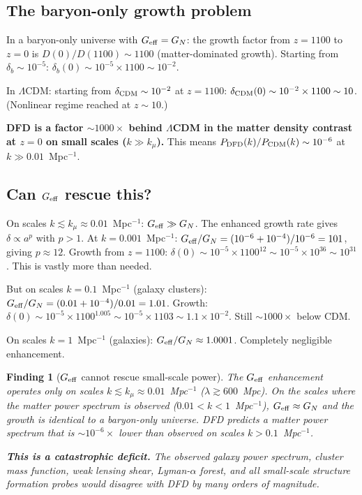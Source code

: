 \documentclass[11pt]{article}
\newtheorem{finding}{Finding}
\newcommand{\ee}[1]{\times 10^{#1}}
\newcommand{\LCDM}{$\Lambda$CDM}
\newcommand{\Geff}{G_{\rm eff}}
\newcommand{\kmu}{k_\mu}
\begin{document}
\subsection{The baryon-only growth problem}

In a baryon-only universe with $\Geff = G_N$: the growth factor from
$z = 1100$ to $z = 0$ is $D(0)/D(1100) \sim 1100$ (matter-dominated
growth). Starting from $\delta_b \sim 10^{-5}$:
$\delta_b(0) \sim 10^{-5} \times 1100 \sim 10^{-2}$.

In \LCDM: starting from $\delta_{\rm CDM} \sim 10^{-2}$ at $z = 1100$:
$\delta_{\rm CDM}(0) \sim 10^{-2} \times 1100 \sim 10$.
(Nonlinear regime reached at $z \sim 10$.)

\textbf{DFD is a factor $\sim 1000\times$ behind \LCDM{} in the matter
density contrast at $z = 0$ on small scales ($k \gg \kmu$).}
This means $P_{\rm DFD}(k) / P_{\rm CDM}(k) \sim 10^{-6}$ at
$k \gg 0.01$~Mpc$^{-1}$.

\subsection{Can $\Geff$ rescue this?}

On scales $k \lesssim \kmu \approx 0.01$~Mpc$^{-1}$: $\Geff \gg G_N$.
The enhanced growth rate gives $\delta \propto a^p$ with $p > 1$.
At $k = 0.001$~Mpc$^{-1}$: $\Geff/G_N = (10^{-6} + 10^{-4})/10^{-6}
= 101$, giving $p \approx 12$. Growth from $z = 1100$:
$\delta(0) \sim 10^{-5} \times 1100^{12} \sim 10^{-5} \times 10^{36}
\sim 10^{31}$. This is vastly more than needed.

But on scales $k = 0.1$~Mpc$^{-1}$ (galaxy clusters):
$\Geff/G_N = (0.01 + 10^{-4})/0.01 = 1.01$. Growth:
$\delta(0) \sim 10^{-5} \times 1100^{1.005} \sim 10^{-5} \times 1103
\sim 1.1\ee{-2}$. Still $\sim 1000\times$ below CDM.

On scales $k = 1$~Mpc$^{-1}$ (galaxies): $\Geff/G_N \approx 1.0001$.
Completely negligible enhancement.

\begin{finding}[$\Geff$ cannot rescue small-scale power]
\label{find:geff-rescue}
The $\Geff$ enhancement operates only on scales $k \lesssim \kmu
\approx 0.01$~Mpc$^{-1}$ ($\lambda \gtrsim 600$~Mpc). On the
scales where the matter power spectrum is observed ($0.01 < k < 1$~Mpc$^{-1}$),
$\Geff \approx G_N$ and the growth is identical to a baryon-only
universe. DFD predicts a matter power spectrum that is
$\sim 10^{-6}\times$ lower than observed on scales $k > 0.1$~Mpc$^{-1}$.

\textbf{This is a catastrophic deficit.} The observed galaxy power
spectrum, cluster mass function, weak lensing shear, Lyman-$\alpha$
forest, and all small-scale structure formation probes would
disagree with DFD by many orders of magnitude.
\end{finding}
\end{document}
